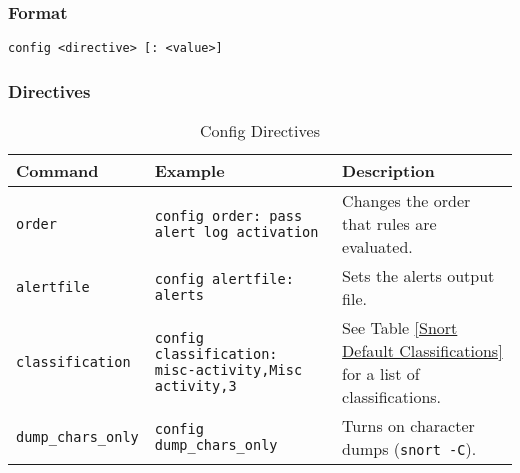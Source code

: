 \documentclass[english]{report}
\begin{document}
\subsubsection{Format}

\begin{center}
\begin{verbatim}
config <directive> [: <value>]
\end{verbatim}
\end{center}


\subsubsection{Directives}
\begin{center}
\begin{longtable}{| p{2in} | p{2.25in} | p{2.25in} |}
\caption{Config Directives} \\
\hline
{\bf Command} & {\bf Example} & {\bf Description}\\
\hline
\hline
\texttt{order} & \texttt{config order: pass alert log activation} & Changes the order that rules are evaluated. \\
\hline
\texttt{alertfile} & \texttt{config alertfile: alerts} & Sets the alerts output file. \\
\hline
\texttt{classification} & \texttt{config classification: misc-activity,Misc activity,3} & See Table \ref{Snort Default Classifications} for a list of
  classifications.\\
\hline
\texttt{dump\_chars\_only} & \texttt{config dump\_chars\_only} & Turns on character dumps (\texttt{snort -C}). \\


\end{longtable}
\end{center}
\end{document}
